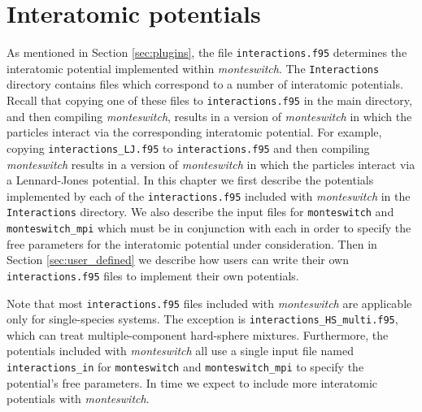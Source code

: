 \documentclass{report}
\begin{document}
\chapter{Interatomic potentials}\label{chapter:interactions}
As mentioned in Section \ref{sec:plugins}, the file \texttt{interactions.f95} determines the interatomic potential implemented within
\emph{monteswitch}. The \texttt{Interactions} directory contains files which correspond to a number of interatomic potentials. Recall that
copying one of these files to \texttt{interactions.f95} in the main directory, and then compiling \emph{monteswitch}, results in a version 
of \emph{monteswitch} in which the particles interact via the corresponding interatomic potential. 
For example, copying \texttt{interactions\_LJ.f95} to \texttt{interactions.f95} and then compiling \emph{monteswitch} results in a version 
of \emph{monteswitch} in which the particles interact via a Lennard-Jones potential. 
In this chapter we first describe the potentials implemented by each of the \texttt{interactions.f95} included with \emph{monteswitch} in the
\texttt{Interactions} directory. We also describe the input files for \texttt{monteswitch} and \texttt{monteswitch\_mpi} which must be
in conjunction with each in order to specify the free parameters for the interatomic potential under consideration.
Then in Section \ref{sec:user_defined} we describe how users can write their own \texttt{interactions.f95} files to implement their own potentials.

Note that most \texttt{interactions.f95} files included with \emph{monteswitch} are applicable only for single-species systems. The exception is 
\texttt{interactions\_HS\_multi.f95}, which can treat multiple-component hard-sphere mixtures.
Furthermore, the potentials included with \emph{monteswitch} all use a single input file named \texttt{interactions\_in} for \texttt{monteswitch} 
and \texttt{monteswitch\_mpi} to specify the potential's free parameters. In time we expect to include more interatomic potentials with \emph{monteswitch}. 
\end{document}
